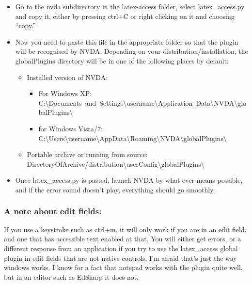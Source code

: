 \documentclass[12pt,a4paper]{report}
\begin{document}
\begin{itemize}
\item Go to the nvda subdirectory in the latex-access folder, select latex\_access.py and copy it, either by pressing ctrl+C or right clicking on it and choosing ``copy.''
\item Now you need to paste this file in the appropriate folder so that the plugin will be recognised by NVDA.  Depending on your distribution/installation, the globalPlugins directory will be in one of the following places by default:
\begin{itemize}
\item Installed version of NVDA:
\begin{itemize}
\item For Windows XP:\\
\mbox{C:\textbackslash Documents and Settings\textbackslash username\textbackslash Application Data\textbackslash NVDA\textbackslash globalPlugins\textbackslash}
\item for Windows Vista/7:\\
\mbox{C:\textbackslash Users\textbackslash username\textbackslash AppData\textbackslash Roaming\textbackslash NVDA\textbackslash globalPlugins\textbackslash}
\end{itemize}
\item Portable archive or running from source:\\
\mbox{DirectoryOfArchive/distribution\textbackslash userConfig\textbackslash globalPlugins\textbackslash}
\end{itemize}
\item Once latex\_access.py is pasted, launch NVDA by what ever means possible, and if the error sound doesn't play, everything should go smoothly.
\end{itemize}

\subsubsection{A note about edit fields:}

If you use a  keystroke such as ctrl+m, it 
will only work if you are in an edit field, and one 
that has accessible text enabled at that. You 
will either get errors, or a different response from 
an application if you try to use the latex\_access global plugin 
in edit fields that are not native controls. I'm 
afraid that's just the way windows works. I know 
for a fact that notepad works with the plugin quite well, but 
in an editor such as EdSharp it does not.
\end{document}
